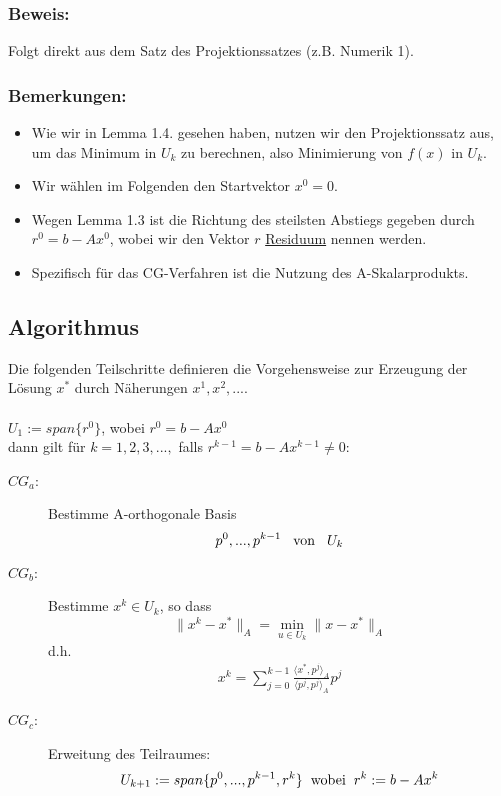 \documentclass{article}
\begin{document}
\subsubsection{Beweis:}
Folgt direkt aus dem Satz des Projektionssatzes (z.B. Numerik 1).

\subsubsection{Bemerkungen:}
\begin{itemize}
	\item Wie wir in Lemma 1.4. gesehen haben, nutzen wir den Projektionssatz aus, um das Minimum in $U_{k}$ zu berechnen, also Minimierung von $f(x)$ in $U_{k}$.
	\item Wir wählen im Folgenden den Startvektor $x^{0} = 0$.
	\item Wegen Lemma 1.3 ist die Richtung des steilsten Abstiegs gegeben durch $r^{0} = b - Ax^{0}$, wobei wir den Vektor $r$ \underline{Residuum} nennen werden.
	\item Spezifisch für das CG-Verfahren ist die Nutzung des A-Skalarprodukts.
\end{itemize}

\subsection{Algorithmus}
Die folgenden Teilschritte definieren die Vorgehensweise zur Erzeugung der Lösung $x^{*}$ durch Näherungen $x^{1}, x^{2},...$.
\\\\$U_{1} := span\{r^{0}\}$, wobei $r^{0} = b - Ax^{0}$
\\dann gilt für $k = 1,2,3,...,$ falls $r^{k-1} = b - Ax^{k-1} \ne 0$:
\begin{description}
\item[$CG_{a}$:] Bestimme A-orthogonale Basis
\begin{equation}
p^{0},...,p^{k-1} \hspace{3mm} \textnormal{von} \hspace{3mm} U_{k}
\end{equation}
\item[$CG_{b}$:] Bestimme $x^{k} \in U_{k}$, so dass
\begin{equation}
\|x^{k} - x^{*}\|_{A} = \underset{u \in U_{k}}{\min} \|x - x^{*}\|_{A}
\end{equation}
d.h.
\begin{align}
x^{k} = \sum_{j=0}^{k-1} \frac {\langle x^{*}, p^{j} \rangle _{A}} {\langle p^{j}, p^{j} \rangle _{A}} p^{j}
\end{align}
\item[$CG_{c}$:] Erweitung des Teilraumes:
\begin{equation}
U_{k+1} := span\{p^{0},...,p^{k-1},r^{k}\} \hspace{2mm} \textnormal{wobei} \hspace{2mm} r^{k} := b - Ax^{k}
\end{equation}
\end{description}
\end{document}
